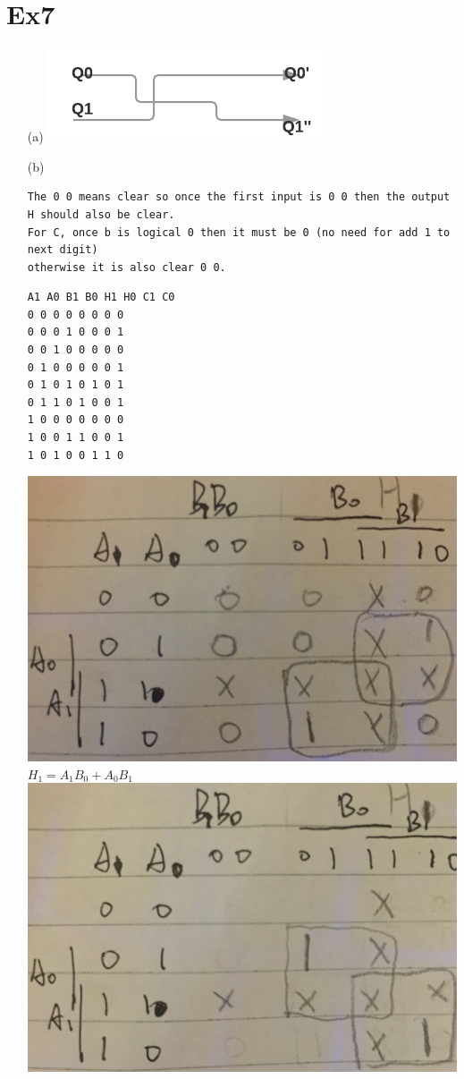 \documentclass[10pt,twoside,a4paper]{article}
\begin{document}
\section{Ex7}
\begin{enumerate}
\item[(a)]
\includegraphics[scale=1]{7.png} 
\item[(b)]
\begin{verbatim}
The 0 0 means clear so once the first input is 0 0 then the output H should also be clear.
For C, once b is logical 0 then it must be 0 (no need for add 1 to next digit) 
otherwise it is also clear 0 0.
\end{verbatim}
\begin{verbatim}
A1 A0 B1 B0 H1 H0 C1 C0 
0 0 0 0 0 0 0 0 
0 0 0 1 0 0 0 1 
0 0 1 0 0 0 0 0 
0 1 0 0 0 0 0 1 
0 1 0 1 0 1 0 1 
0 1 1 0 1 0 0 1 
1 0 0 0 0 0 0 0 
1 0 0 1 1 0 0 1 
1 0 1 0 0 1 1 0
\end{verbatim}
\includegraphics[scale=0.1]{7H1.JPG} 
$H_1 =A_1 B_0 + A_0 B_1$\newline
\includegraphics[scale=0.1]{7H0.JPG} 

\end{enumerate}
\end{document}

